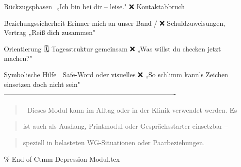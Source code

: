 Rückzugsphasen         🧍„Ich bin bei dir -- leise."   ❌ Kontaktabbruch

Beziehungssicherheit   \textcolor{ctmmPurple}{\faBrain} Erinner mich an unser Band / ❌ Schuldzuweisungen,
Vertrag                         „Reiß dich zusammen"

Orientierung           🗓️ Tagesstruktur gemeinsam      ❌ „Was willst du
checken                         jetzt machen?"

Symbolische Hilfe      🔗 Safe-Word oder visuelles     ❌ „So schlimm kann's
Zeichen einsetzen               doch nicht sein"
----------------------------------------------------------------------------

\begin{quote}
📎 Dieses Modul kann im Alltag oder in der Klinik verwendet werden. Es
\end{quote}
\begin{quote}
ist auch als Aushang, Printmodul oder Gesprächsstarter einsetzbar --
\end{quote}
\begin{quote}
speziell in belasteten WG-Situationen oder Paarbeziehungen.
\end{quote}

\% End of Ctmm Depression Modul.tex
